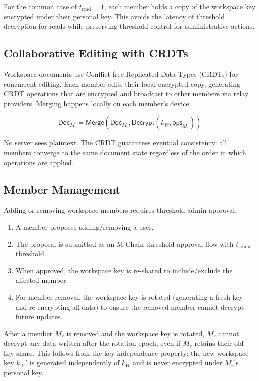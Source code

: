 For the common case of $t_{\text{read}} = 1$, each member holds a copy of
the workspace key encrypted under their personal key. This avoids the
latency of threshold decryption for reads while preserving threshold
control for administrative actions.

\subsection{Collaborative Editing with CRDTs}

Workspace documents use Conflict-free Replicated Data Types (CRDTs)
\cite{shapiro2011crdt} for concurrent editing. Each member edits their
local encrypted copy, generating CRDT operations that are encrypted and
broadcast to other members via relay providers. Merging happens locally
on each member's device:

\begin{equation}
    \mathsf{Doc}_{M_i} = \mathsf{Merge}(\mathsf{Doc}_{M_i}, \mathsf{Decrypt}(k_W, \mathsf{ops}_{M_j}))
\end{equation}

No server sees plaintext. The CRDT guarantees eventual consistency:
all members converge to the same document state regardless of the
order in which operations are applied.

\subsection{Member Management}

Adding or removing workspace members requires threshold admin approval:

\begin{enumerate}
    \item A member proposes adding/removing a user.
    \item The proposal is submitted as an M-Chain threshold approval flow
    with $t_{\text{admin}}$ threshold.
    \item When approved, the workspace key is re-shared to include/exclude
    the affected member.
    \item For member removal, the workspace key is rotated (generating a
    fresh key and re-encrypting all data) to ensure the removed member
    cannot decrypt future updates.
\end{enumerate}

\begin{proposition}
After a member $M_r$ is removed and the workspace key is rotated, $M_r$
cannot decrypt any data written after the rotation epoch, even if $M_r$
retains their old key share. This follows from the key independence
property: the new workspace key $k_W'$ is generated independently of
$k_W$ and is never encrypted under $M_r$'s personal key.
\end{proposition}

